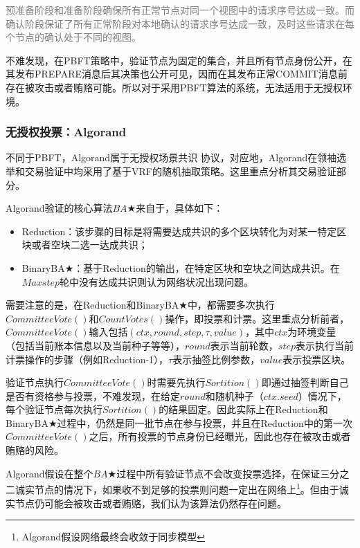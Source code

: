 \textcolor{gray}{预准备阶段和准备阶段确保所有正常节点对同一个视图中的请求序号达成一致。而确认阶段保证了所有正常阶段对本地确认的请求序号达成一致，及时这些请求在每个节点的确认处于不同的视图。}

不难发现，在PBFT策略中，验证节点为固定的集合，并且所有节点身份公开，在其发布PREPARE消息后其决策也公开可见，因而在其发布正常COMMIT消息前存在被攻击或者贿赂可能。所以对于采用PBFT算法的系统，无法适用于无授权环境。

\subsubsection{无授权投票：Algorand}

不同于PBFT，Algorand\cite{gilad2017algorand}属于无授权场景共识 协议，对应地，Algorand在领袖选举和交易验证中均采用了基于VRF的随机抽取策略。这里重点分析其交易验证部分。

Algorand验证的核心算法$BA\bigstar$来自于\cite{miller2016honey}，具体如下：
\begin{itemize}
	\item Reduction：该步骤的目标是将需要达成共识的多个区块转化为对某一特定区块或者空块二选一达成共识；
	\item BinaryBA$\bigstar$：基于Reduction的输出，在特定区块和空块之间达成共识。在$Maxstep$轮中没有达成共识则认为网络状况出现问题。
\end{itemize}

需要注意的是，在Reduction和BinaryBA$\bigstar$中，都需要多次执行$CommitteeVote()$和$CountVotes()$操作，即投票和计票。这里重点分析前者，$CommitteeVote()$输入包括$(ctx,round,step,\tau,value)$，其中$ctx$为环境变量（包括当前账本信息以及当前种子等等），$round$表示当前轮数，$step$表示执行当前计票操作的步骤（例如Reduction-1），$\tau$表示抽签比例参数，$value$表示投票区块。

验证节点执行$CommitteeVote()$时需要先执行$Sortition()$即通过抽签判断自己是否有资格参与投票，不难发现，在给定$round$和随机种子（$ctx.seed$）情况下，每个验证节点每次执行$Sortition()$的结果固定。因此实际上在Reduction和BinaryBA$\bigstar$过程中，仍然是同一批节点在参与投票，并且在Reduction中的第一次$CommitteeVote()$之后，所有投票的节点身份已经曝光，因此也存在被攻击或者贿赂的风险。

Algorand假设在整个$BA\bigstar$过程中所有验证节点不会改变投票选择，在保证三分之二诚实节点的情况下，如果收不到足够的投票则问题一定出在网络上\footnote{Algorand假设网络最终会收敛于同步模型}。但由于诚实节点仍可能会被攻击或者贿赂，我们认为该算法仍然存在问题。


